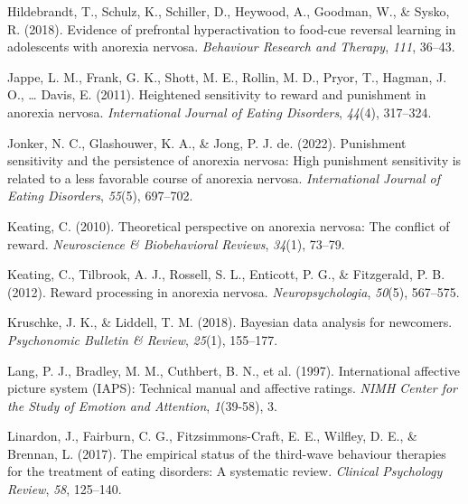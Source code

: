 \documentclass[
  man,floatsintext]{apa6}
\newlength{\cslhangindent}
\newlength{\cslentryspacingunit} %
\newenvironment{CSLReferences}[2] %
 {%
  \setlength{\parindent}{0pt}
  \ifodd #1
  \let\oldpar\par
  \def\par{\hangindent=\cslhangindent\oldpar}
  \fi
  \setlength{\parskip}{#2\cslentryspacingunit}
 }%
 {}
\begin{document}
\begin{CSLReferences}{1}{0}
\leavevmode{}%
Hildebrandt, T., Schulz, K., Schiller, D., Heywood, A., Goodman, W., \& Sysko, R. (2018). Evidence of prefrontal hyperactivation to food-cue reversal learning in adolescents with anorexia nervosa. \emph{Behaviour Research and Therapy}, \emph{111}, 36--43.

\leavevmode{}%
Jappe, L. M., Frank, G. K., Shott, M. E., Rollin, M. D., Pryor, T., Hagman, J. O., \ldots{} Davis, E. (2011). Heightened sensitivity to reward and punishment in anorexia nervosa. \emph{International Journal of Eating Disorders}, \emph{44}(4), 317--324.

\leavevmode{}%
Jonker, N. C., Glashouwer, K. A., \& Jong, P. J. de. (2022). Punishment sensitivity and the persistence of anorexia nervosa: High punishment sensitivity is related to a less favorable course of anorexia nervosa. \emph{International Journal of Eating Disorders}, \emph{55}(5), 697--702.

\leavevmode{}%
Keating, C. (2010). Theoretical perspective on anorexia nervosa: The conflict of reward. \emph{Neuroscience \& Biobehavioral Reviews}, \emph{34}(1), 73--79.

\leavevmode{}%
Keating, C., Tilbrook, A. J., Rossell, S. L., Enticott, P. G., \& Fitzgerald, P. B. (2012). Reward processing in anorexia nervosa. \emph{Neuropsychologia}, \emph{50}(5), 567--575.

\leavevmode{}%
Kruschke, J. K., \& Liddell, T. M. (2018). Bayesian data analysis for newcomers. \emph{Psychonomic Bulletin \& Review}, \emph{25}(1), 155--177.

\leavevmode{}%
Lang, P. J., Bradley, M. M., Cuthbert, B. N., et al. (1997). International affective picture system (IAPS): Technical manual and affective ratings. \emph{NIMH Center for the Study of Emotion and Attention}, \emph{1}(39-58), 3.

\leavevmode{}%
Linardon, J., Fairburn, C. G., Fitzsimmons-Craft, E. E., Wilfley, D. E., \& Brennan, L. (2017). The empirical status of the third-wave behaviour therapies for the treatment of eating disorders: A systematic review. \emph{Clinical Psychology Review}, \emph{58}, 125--140.


\end{CSLReferences}
\end{document}
